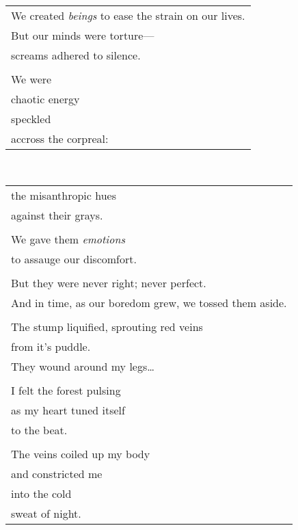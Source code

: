 \documentclass{article}
\begin{document}
\begin{center}
\begin{tabular}{l}
\hspace*{4ex}We created \textit{beings} to ease the strain on our lives. \\
\hspace*{4ex}But our minds were torture---\\
\hspace*{4ex}screams adhered to silence. \\
\\
\hspace*{4ex}We were \\
\hspace*{4ex}chaotic energy \\
\hspace*{4ex}speckled \\
\hspace*{4ex}accross the corpreal: \\
\end{tabular} \\
\begin{tabular}{l}
\hspace*{4ex}the misanthropic hues \\
\hspace*{4ex}against their grays. \\
\\
\hspace*{4ex}We gave them \textit{emotions} \\
\hspace*{4ex}to assauge our discomfort. \\
\\
\hspace*{4ex}But they were never right; never perfect. \\
\hspace*{4ex}And in time, as our boredom grew, we tossed them aside. \\
\\
The stump liquified, sprouting red veins \\
from it's puddle. \\
They wound around my legs\ldots \\
\\
I felt the forest pulsing \\
as my heart tuned itself \\
to the beat. \\
\\
The veins coiled up my body \\
and constricted me \\
into the cold \\
sweat of night. \\
\end{tabular}
\end{center}
\end{document}
